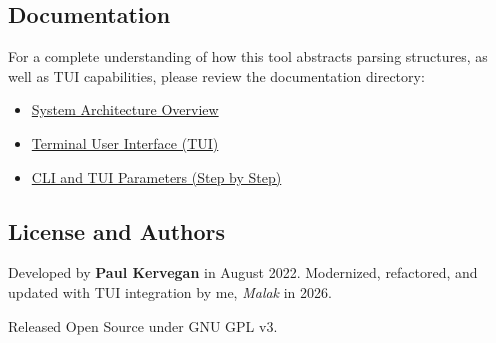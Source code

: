 \documentclass[a4paper, 12pt, twoside]{article}
\begin{document}
\subsection*{Documentation}

For a complete understanding of how this tool abstracts parsing structures, as well as TUI capabilities, please review the documentation directory:

\begin{itemize}
    \item \href{docs/architecture/architecture.md}{System Architecture Overview}
    \item \href{docs/tui/tui.md}{Terminal User Interface (TUI)}
    \item \href{docs/cli\_tui\_parameters/cli\_tui\_parameters.md}{CLI and TUI Parameters (Step by Step)}
\end{itemize}

\subsection*{License and Authors}

Developed by \textbf{Paul Kervegan} in August 2022.
Modernized, refactored, and updated with TUI integration by me, \textit{Malak} in 2026.

Released Open Source under GNU GPL v3.
\end{document}
